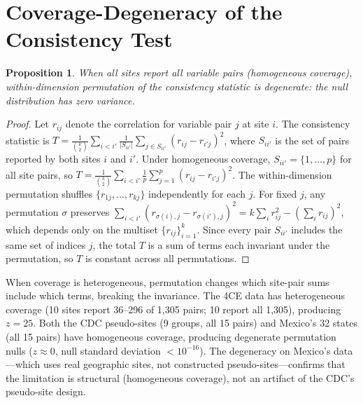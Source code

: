 \documentclass{article}
\newtheorem{proposition}{Proposition}
\begin{document}
\appendix

\section{Coverage-Degeneracy of the Consistency Test}
\label{app:degeneracy}

\begin{proposition}
When all sites report all variable pairs (homogeneous coverage), within-dimension permutation of the consistency statistic is degenerate: the null distribution has zero variance.
\end{proposition}

\begin{proof}
Let $r_{ij}$ denote the correlation for variable pair $j$ at site $i$.  The consistency statistic is $T = \frac{1}{\binom{k}{2}} \sum_{i < i'} \frac{1}{|S_{ii'}|} \sum_{j \in S_{ii'}} (r_{ij} - r_{i'j})^2$, where $S_{ii'}$ is the set of pairs reported by both sites $i$ and $i'$.
Under homogeneous coverage, $S_{ii'} = \{1, \ldots, p\}$ for all site pairs, so $T = \frac{1}{\binom{k}{2}} \sum_{i < i'} \frac{1}{p} \sum_{j=1}^{p} (r_{ij} - r_{i'j})^2$.
The within-dimension permutation shuffles $\{r_{1j}, \ldots, r_{kj}\}$ independently for each $j$.
For fixed $j$, any permutation $\sigma$ preserves $\sum_{i<i'} (r_{\sigma(i),j} - r_{\sigma(i'),j})^2 = k \sum_i r_{ij}^2 - (\sum_i r_{ij})^2$, which depends only on the multiset $\{r_{ij}\}_{i=1}^k$.
Since every pair $S_{ii'}$ includes the same set of indices $j$, the total $T$ is a sum of terms each invariant under the permutation, so $T$ is constant across all permutations.
\end{proof}

When coverage is heterogeneous, permutation changes which site-pair sums include which terms, breaking the invariance.  The 4CE data has heterogeneous coverage (10 sites report 36--296 of 1,305 pairs; 10 report all 1,305), producing $z = 25$.  Both the CDC pseudo-sites (9 groups, all 15 pairs) and Mexico's 32 states (all 15 pairs) have homogeneous coverage, producing degenerate permutation nulls ($z \approx 0$, null standard deviation $< 10^{-16}$).  The degeneracy on Mexico's data---which uses real geographic sites, not constructed pseudo-sites---confirms that the limitation is structural (homogeneous coverage), not an artifact of the CDC's pseudo-site design.



\end{document}
